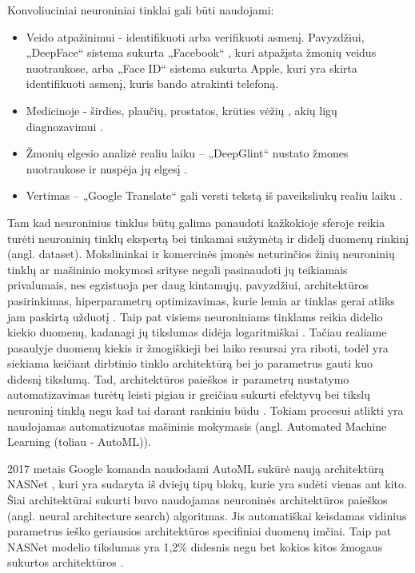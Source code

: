 \documentclass{VUMIFPSbakalaurinis}
\begin{document}
Konvoliuciniai neuroniniai tinklai gali būti naudojami:
\begin{itemize}
    \item Veido atpažinimui - identifikuoti arba verifikuoti asmenį. Pavyzdžiui, „DeepFace“ sistema sukurta „Facebook“ \cite{Taigman:2014:DCG:2679600.2680208}, kuri atpažįsta žmonių veidus nuotraukose, 
arba „Face ID“ sistema sukurta Apple, kuri yra skirta identifikuoti asmenį, kuris bando atrakinti telefoną. 
    \item Medicinoje - širdies, plaučių, prostatos, krūties vėžių \cite{cancer}, akių ligų diagnozavimui \cite{eyedis}.
    \item Žmonių elgesio analizė realiu laiku – „DeepGlint“ nustato žmones nuotraukose ir nuspėja jų elgesį \cite{deepGlint}.
    \item Vertimas – „Google Translate“ gali versti tekstą iš paveiksliukų realiu laiku \cite{Raschka:2015:PML:2886323}.
\end{itemize}

Tam kad neuroninius tinklus būtų galima panaudoti kažkokioje sferoje reikia turėti neuroninių tinklų ekspertą bei tinkamai sužymėtą ir didelį duomenų rinkinį (angl. dataset). 
Mokslininkai ir komercinės įmonės neturinčios žinių neuroninių tinklų ar mašininio mokymosi srityse negali pasinaudoti jų teikiamais privalumais, nes egzistuoja per daug kintamųjų, pavyzdžiui, architektūros pasirinkimas, hiperparametrų optimizavimas, 
kurie lemia ar tinklas gerai atliks jam paskirtą užduotį \cite{14f00e7a0861477a81f65b5c51f660f4, DBLP:journals/corr/abs-1902-06827}. Taip pat visiems neuroniniams tinklams reikia didelio kiekio duomenų, kadanagi jų tikslumas didėja logaritmiškai \cite{DBLP:journals/corr/ChoLSCD15, DBLP:journals/corr/SunSSG17}. 
Tačiau realiame pasaulyje duomenų kiekis ir žmogiškieji bei laiko resursai yra riboti, todėl yra siekiama keičiant dirbtinio tinklo architektūrą bei jo parametrus gauti kuo didesnį tikslumą. Tad, architektūros paieškos ir parametrų 
nustatymo automatizavimas turėtų leisti pigiau ir greičiau sukurti efektyvų bei tikslų neuroninį tinklą negu kad tai darant rankiniu būdu \cite{DBLP:journals/corr/RealMSSSLK17}.
Tokiam procesui atlikti yra naudojamas automatizuotas mašininis mokymasis (angl. Automated Machine Learning (toliau - AutoML)).

2017 metais Google komanda naudodami AutoML sukūrė naują architektūrą NASNet \cite{DBLP:journals/corr/ZophVSL17}, kuri yra sudaryta iš dviejų tipų blokų, kurie yra sudėti vienas ant kito. 
Šiai architektūrai sukurti buvo naudojamas neuroninės architektūros paieškos (angl. neural architecture search) algoritmas. Jis automatiškai keisdamas vidinius parametrus ieško geriausios architektūros specifiniai duomenų imčiai.
Taip pat NASNet modelio tikslumas yra 1,2\% didesnis negu bet kokios kitos žmogaus sukurtos architektūros \cite{DBLP:journals/corr/ZophVSL17}.
\end{document}

